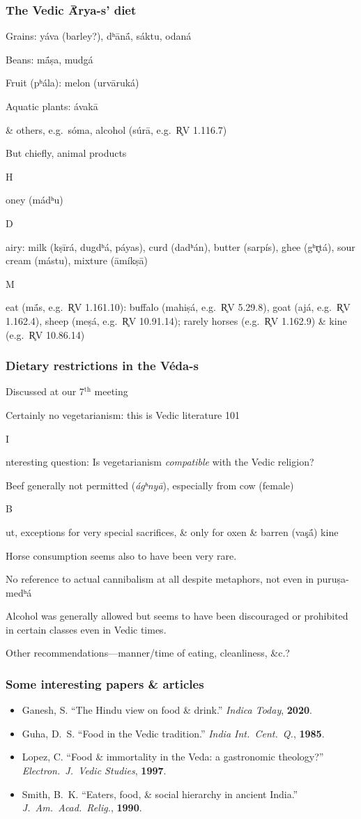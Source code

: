 \documentclass[pdf]{beamer}
\newcommand{\Subitem}[1]{{\setlength\itemindent{12pt} \item[-] #1}}
\begin{document}
\begin{frame} \frametitle{The Vedic Ā́rya-s' diet}
\begin{itemize}
	\item Grains: yáva (barley?), dʰānā́, sáktu, odaná
	\item Beans: mā́ṣa, mudgá
	\item Fruit (pʰála): melon (urvāruká)
	\item Aquatic plants: ávakā
	\item \& others, e.g.~sóma, alcohol (súrā, e.g.~R̥V 1.116.7)
	\item But chiefly, animal products
	\Subitem Honey (mádʰu)
	\Subitem Dairy: milk (kṣīrá, dugdʰá, páyas), curd (dadʰán), butter (sarpís), ghee (gʰr̥tá), sour cream (mástu), mixture (āmíkṣā)
	\Subitem Meat (mā́s, e.g.~R̥V 1.161.10): buffalo (mahiṣá, e.g.~R̥V 5.29.8), goat (ajá, e.g.~R̥V 1.162.4), sheep (meṣá, e.g.~R̥V 10.91.14); rarely horses (e.g.~R̥V 1.162.9) \& kine (e.g.~R̥V 10.86.14)
\end{itemize}
\end{frame}

\begin{frame} \frametitle{Dietary restrictions in the Véda-s}
\begin{itemize}
	\item Discussed at our 7$^{\text{th}}$ meeting
	\item Certainly no vegetarianism: this is Vedic literature 101
	\Subitem Interesting question: Is vegetarianism \emph{compatible} with the Vedic religion?
	\item Beef generally not permitted (\textit{ágʰnyā}), especially from cow (female)
	\Subitem But, exceptions for very special sacrifices, \& only for oxen \& barren (vaşā́) kine
	\item Horse consumption seems also to have been very rare.
	\item No reference to actual cannibalism at all despite metaphors, not even in puruṣa-medʰá
	\item Alcohol was generally allowed but seems to have been discouraged or prohibited in certain classes even in Vedic times.
	\item Other recommendations---manner/time of eating, cleanliness, \&c.?
\end{itemize}
\end{frame}


\begin{frame} \frametitle{Some interesting papers \& articles}
\begin{itemize}
	\item Ganesh, S. ``The Hindu view on food \& drink.'' \textit{Indica Today}, \textbf{2020}.
	\item Guha, D.~S. ``Food in the Vedic tradition.'' \textit{India Int.~Cent.~Q.}, \textbf{1985}.
	\item Lopez, C. ``Food \& immortality in the Veda: a gastronomic theology?'' \textit{Electron.~J.~Vedic Studies}, \textbf{1997}.
	\item Smith, B.~K. ``Eaters, food, \& social hierarchy in ancient India.'' \textit{J.~Am.~Acad.~Relig.}, \textbf{1990}.
\end{itemize}
\end{frame}
\end{document}
